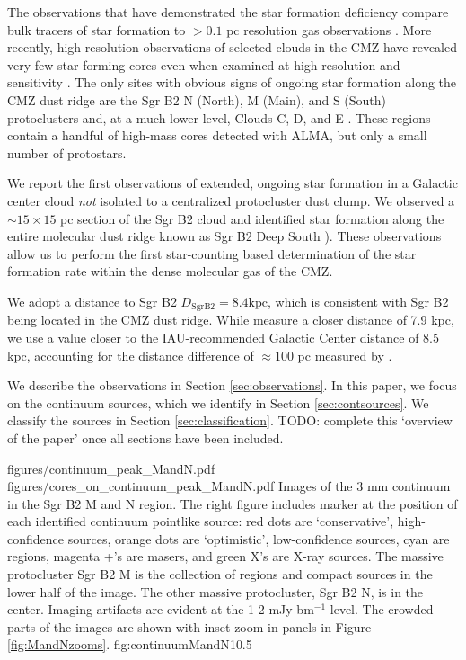 \documentclass[twocolumn]{aastex61}
\newcommand{\dsgrb}{\ensuremath{8.4 \textrm{kpc}}\xspace}
\begin{document}
The observations that have demonstrated the star formation deficiency compare
bulk tracers of star formation to $>0.1$ pc resolution gas observations
\citep[e.g.][]{Barnes2017b}.  More recently, high-resolution observations
of selected clouds in the CMZ have revealed very few star-forming cores
even when examined at high resolution and sensitivity
\citep{Rathborne2015a,Kauffmann2016a,Kauffmann2016b}.  The only sites with
obvious signs of ongoing star formation along the CMZ dust ridge are
the Sgr B2 N (North), M (Main), and S (South) protoclusters \citep{Schmiedeke2016a} and, at a much
lower level, Clouds C, D, and E \citep[][Walker et al, in
prep;]{Ginsburg2015b,Barnes2017b}.  These regions contain a handful of
high-mass cores detected with ALMA, but only a small number of protostars.

We report the first observations of extended, ongoing star formation in a
Galactic center cloud \emph{not} isolated to a centralized protocluster dust
clump.  We observed a $\sim15\times15$ pc section of the Sgr B2 cloud and
identified star formation along the entire molecular dust ridge known as Sgr B2
Deep South \citep[DS, also known as the `Southern
Complex'][]{Jones2012a,Schmiedeke2016a}).  These observations allow us to
perform the first
star-counting based determination of the star formation rate within the dense
molecular gas of the CMZ.

We adopt a distance to Sgr B2 $D_{\mathrm{Sgr B2}}=\dsgrb$, which is consistent
with Sgr B2 being
located in the CMZ dust ridge.  While \citet{Reid2009a} measure a closer
distance of 7.9 kpc, we use a value closer to the IAU-recommended Galactic
Center distance of 8.5 kpc, accounting for the distance difference of
$\approx100$ pc measured by \citet{Reid2009a}.

We describe the observations in Section \ref{sec:observations}. In this paper,
we focus on the continuum sources, which we identify in Section
\ref{sec:contsources}.  We classify the sources in Section
\ref{sec:classification}.  
{\color{red} TODO: complete this `overview of the paper' once all sections have
been included.}

\FigureTwo
{figures/continuum_peak_MandN.pdf}
{figures/cores_on_continuum_peak_MandN.pdf}
{Images of the 3 mm continuum in the Sgr B2 M and N region.  The right figure
includes marker at the position of each identified continuum pointlike
source: red dots are `conservative', high-confidence sources,
orange dots are `optimistic', low-confidence sources,
cyan are \hii regions, magenta +'s are masers, and green X's are X-ray sources.
The massive protocluster Sgr B2 M is the collection of \hii regions and compact
sources in the lower half of the image.  The other massive protocluster, Sgr B2
N, is in the center.  Imaging artifacts are evident at the
1-2 mJy bm$^{-1}$ level.
The crowded parts of the images are shown with inset zoom-in panels
in Figure \ref{fig:MandNzooms}.
}
{fig:continuumMandN}{1}{0.5\textwidth}
\end{document}
